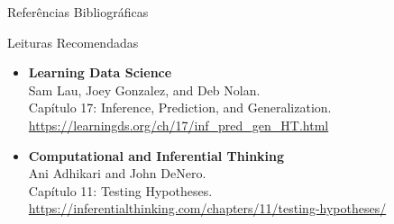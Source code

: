 \begin{frame}{Referências Bibliográficas}
    \begin{block}{Leituras Recomendadas}
        \footnotesize
        \begin{itemize}
            \item \textbf{Learning Data Science} \\
            Sam Lau, Joey Gonzalez, and Deb Nolan. \\
            Capítulo 17: Inference, Prediction, and Generalization. \\
            \url{https://learningds.org/ch/17/inf_pred_gen_HT.html}
            \vspace{0.3cm}
            \item \textbf{Computational and Inferential Thinking} \\
            Ani Adhikari and John DeNero. \\
            Capítulo 11: Testing Hypotheses. \\
            \url{https://inferentialthinking.com/chapters/11/testing-hypotheses/}
        \end{itemize}
    \end{block}
\end{frame}

